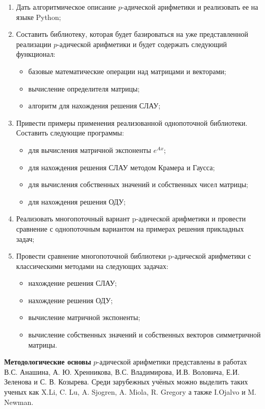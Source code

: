 \documentclass[master, och, autoref, times]{sty/SCWorks}
\theoremstyle{plain}
\theoremstyle{definition}
\numberwithin{equation}{section}
\begin{document}
\begin{enumerate}
	\item Дать алгоритмическое описание $p$-адической арифметики и реализовать ее на языке Python;
	\item Составить библиотеку, которая будет базироваться на уже представленной реализации $p$-адической арифметики и будет содержать следующий функционал:  
	\begin{itemize}
    \item базовые математические операции над матрицами и векторами;
    \item вычисление определителя матрицы;
    \item алгоритм для нахождения решения СЛАУ;
    \end{itemize}
    \item Привести примеры применения реализованной однопоточной библиотеки. Составить следующие программы:
	\begin{itemize}
    \item для вычисления матричной экспоненты $e^{Ax}$;
    \item для нахождения решения СЛАУ методом Крамера и Гаусса;
    \item для вычисления собственных значений и собственных чисел \mbox{матрицы};
    \item для нахождения решения ОДУ;
    \end{itemize}
    \item Реализовать многопоточный вариант p-адической арифметики и \mbox{провести} сравнение с однопоточным \mbox{вариантом} на примерах решения прикладных задач;
    \item Провести сравнение многопоточной библиотеки p-адической \mbox{арифметики} с классическими методами на следующих задачах:
    \begin{itemize}
    \item нахождение решения СЛАУ;
    \item нахождение решения ОДУ;    
 	\item вычисление матричной экспоненты;
 	\item вычисление собственных значений и собственных векторов симметричной матрицы.
    \end{itemize}
\end{enumerate}


\textbf{Методологические основы} $p$-адической арифметики представлены в работах В.С. Анашина, А. Ю. Хренникова, В.С. Владимирова, И.В. Воловича, Е.И. Зеленова и С. В. Козырева. Среди зарубежных учёных можно выделить таких ученых как X.Li, C. Lu, A. Sjogren, A. Miola, R. Gregory а также I.Ojalvo и M. Newman.
\end{document}
